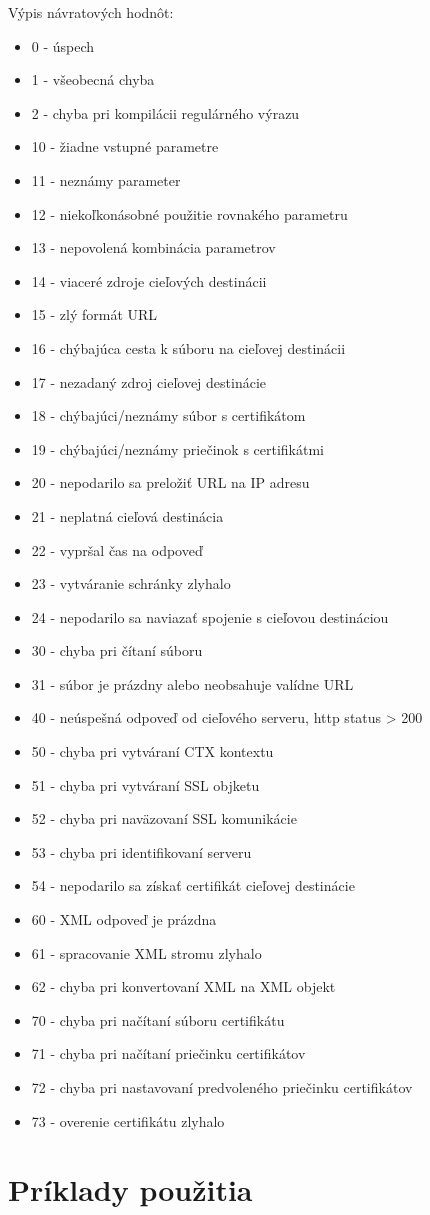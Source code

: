 Výpis návratových hodnôt:
\begin{itemize}
  \item{0 - úspech}
  \item{1 - všeobecná chyba}
  \item{2 - chyba pri kompilácii regulárného výrazu}
  \item{10 - žiadne vstupné parametre}
  \item{11 - neznámy parameter}
  \item{12 - niekoľkonásobné použitie rovnakého parametru}
  \item{13 - nepovolená kombinácia parametrov}
  \item{14 - viaceré zdroje cieľových destinácii}
  \item{15 - zlý formát URL}
  \item{16 - chýbajúca cesta k súboru na cieľovej destinácii}
  \item{17 - nezadaný zdroj cieľovej destinácie}
  \item{18 - chýbajúci/neznámy súbor s certifikátom}
  \item{19 - chýbajúci/neznámy priečinok s certifikátmi}
  \item{20 - nepodarilo sa preložiť URL na IP adresu}
  \item{21 - neplatná cieľová destinácia}
  \item{22 - vypršal čas na odpoveď}
  \item{23 - vytváranie schránky zlyhalo}
  \item{24 - nepodarilo sa naviazať spojenie s cieľovou destináciou}
  \item{30 - chyba pri čítaní súboru}
  \item{31 - súbor je prázdny alebo neobsahuje valídne URL}
  \item{40 - neúspešná odpoveď od cieľového serveru, http status > 200}
  \item{50 - chyba pri vytváraní CTX kontextu}
  \item{51 - chyba pri vytváraní SSL objketu}
  \item{52 - chyba pri naväzovaní SSL komunikácie}
  \item{53 - chyba pri identifikovaní serveru}
  \item{54 - nepodarilo sa získať certifikát cieľovej destinácie}
  \item{60 - XML odpoveď je prázdna}
  \item{61 - spracovanie XML stromu zlyhalo}
  \item{62 - chyba pri konvertovaní XML na XML objekt}
  \item{70 - chyba pri načítaní súboru certifikátu}
  \item{71 - chyba pri načítaní priečinku certifikátov}
  \item{72 - chyba pri nastavovaní predvoleného priečinku certifikátov}
  \item{73 - overenie certifikátu zlyhalo}
\end{itemize}

\chapter{Príklady použitia}
\label{examples}


